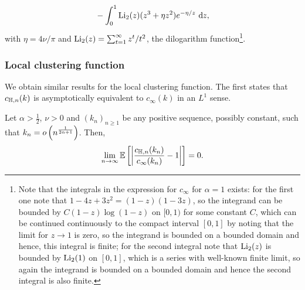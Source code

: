 \begin{theorem}
\begin{align*}
	&\hspace{10pt}- \int_0^1 \operatorname{Li}_2(z)(z^3 + \eta z^2) e^{-\eta/z} \operatorname{\, \mathrm{d}\hspace{-2pt}} z,		
\end{align*}
with $\eta = 4\nu/\pi$ and $\operatorname{Li}_2(z) = \sum_{t = 1}^\infty z^t/t^2$, the dilogarithm function\footnote{Note that the integrals in the expression for $c_\infty$ for $\alpha = 1$ exists: for the first one note that $1-4z+3z^2=(1-z)(1-3z)$, so the integrand can be bounded by $C(1-z)\log(1-z)$ on $[0,1)$ for some constant $C$, which can be continued continuously to the compact interval $[0,1]$ by noting that the limit for $z \rightarrow 1$ is zero, so the integrand is bounded on a bounded domain and hence, this integral is finite; for the second integral note that $\operatorname{Li}_2(z)$ is bounded by $\operatorname{Li}_2(1)$ on $[0,1]$, which is a series with well-known finite limit, so again the integrand is bounded on a bounded domain and hence the second integral is also finite.}. 
\end{theorem}




\subsubsection{Local clustering function}

We obtain similar results for the local clustering function. The first states that $c_{\mathbb{H},n}(k)$ is asymptotically equivalent to $c_\infty(k)$ in an $L^1$ sense.

\begin{theorem}
\label{thm:asymptotic_local_clustering_hyperbolic}
Let $\alpha > \frac{1}{2}$, $\nu > 0$ and $(k_n)_{n \ge 1}$ be any positive sequence, possibly constant, such that $k_n = o\left(n^{\frac{1}{2\alpha + 1}}\right)$. Then, 
\[
	\lim_{n \to \infty} \mathbb{E}\left[\left|\frac{c_{\mathbb{H},n}(k_n)}{c_\infty(k_n)} - 1\right|\right] = 0.
\]
\end{theorem}

